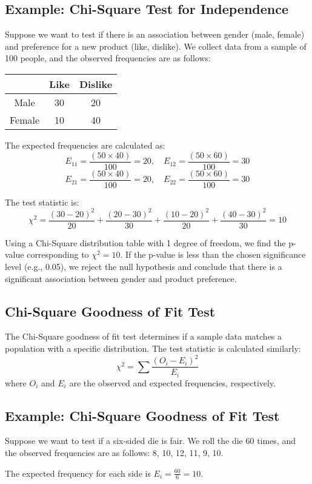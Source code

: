 \documentclass{article}
\begin{document}
\subsection{Example: Chi-Square Test for Independence}
Suppose we want to test if there is an association between gender (male, female) and preference for a new product (like, dislike). We collect data from a sample of 100 people, and the observed frequencies are as follows:

\begin{tabular}{|c|c|c|}
\hline
 & Like & Dislike \\
\hline
Male & 30 & 20 \\
\hline
Female & 10 & 40 \\
\hline
\end{tabular}

The expected frequencies are calculated as:
\[
E_{11} = \frac{(50 \times 40)}{100} = 20, \quad E_{12} = \frac{(50 \times 60)}{100} = 30
\]
\[
E_{21} = \frac{(50 \times 40)}{100} = 20, \quad E_{22} = \frac{(50 \times 60)}{100} = 30
\]

The test statistic is:
\[
\chi^2 = \frac{(30 - 20)^2}{20} + \frac{(20 - 30)^2}{30} + \frac{(10 - 20)^2}{20} + \frac{(40 - 30)^2}{30} = 10
\]

Using a Chi-Square distribution table with 1 degree of freedom, we find the p-value corresponding to \(\chi^2 = 10\). If the p-value is less than the chosen significance level (e.g., 0.05), we reject the null hypothesis and conclude that there is a significant association between gender and product preference.

\subsection{Chi-Square Goodness of Fit Test}
The Chi-Square goodness of fit test determines if a sample data matches a population with a specific distribution. The test statistic is calculated similarly:
\[
\chi^2 = \sum \frac{(O_i - E_i)^2}{E_i}
\]
where \(O_i\) and \(E_i\) are the observed and expected frequencies, respectively.

\subsection{Example: Chi-Square Goodness of Fit Test}
Suppose we want to test if a six-sided die is fair. We roll the die 60 times, and the observed frequencies are as follows: 8, 10, 12, 11, 9, 10.

The expected frequency for each side is \(E_i = \frac{60}{6} = 10\).
\end{document}
